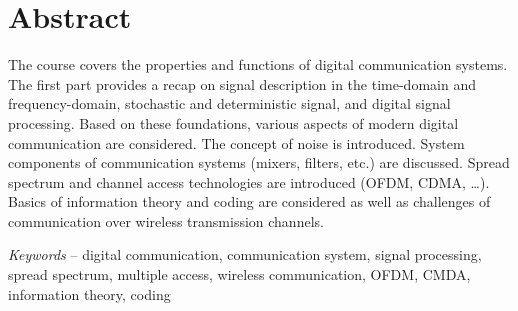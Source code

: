 %
%
%

{}
\chapter*{Abstract}

The course covers the properties and functions of digital communication systems. The first part provides a recap on signal description in the time-domain and frequency-domain, stochastic and deterministic signal, and digital signal processing. Based on these foundations, various aspects of modern digital communication are considered. The concept of noise is introduced. System components of communication systems (mixers, filters, etc.) are discussed. Spread spectrum and channel access technologies are introduced (OFDM, CDMA, …). Basics of information theory and coding are considered as well as challenges of communication over wireless transmission channels.

\textit{Keywords} -- digital communication, communication system, signal processing, spread spectrum, multiple access, wireless communication, OFDM, CMDA, information theory, coding
